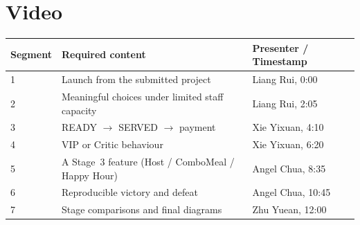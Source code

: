 \section{Video}

\begin{tabularx}{\textwidth}{@{}lXl@{}}
\toprule \textbf{Segment} & \textbf{Required content} & \textbf{Presenter / Timestamp}\\\midrule
1 & Launch from the submitted project & Liang Rui, 0:00 \\
2 & Meaningful choices under limited staff capacity & Liang Rui, 2:05 \\
3 & READY $\to$ SERVED $\to$ payment & Xie Yixuan, 4:10 \\
4 & VIP or Critic behaviour & Xie Yixuan, 6:20 \\
5 & A Stage~3 feature (Host / ComboMeal / Happy Hour) & Angel Chua, 8:35 \\
6 & Reproducible victory and defeat & Angel Chua, 10:45 \\
7 & Stage comparisons and final diagrams & Zhu Yuean, 12:00 \\
\bottomrule
\end{tabularx}
